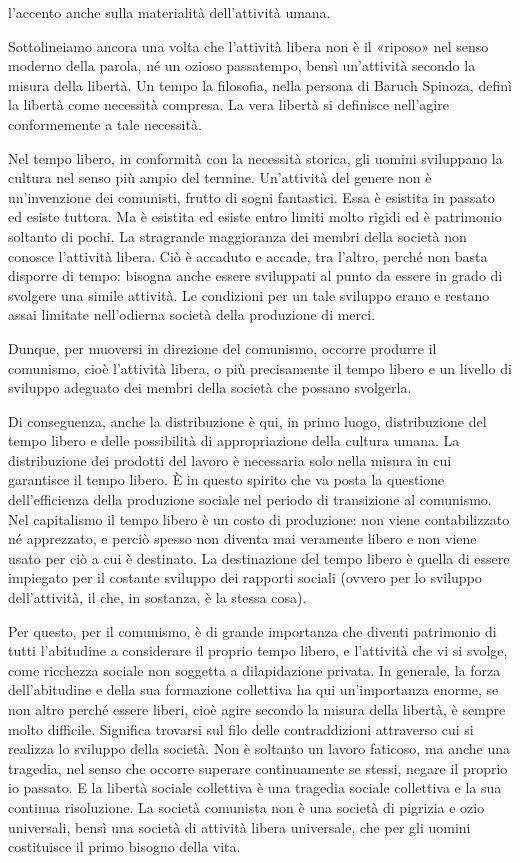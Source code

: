 \documentclass[../main]{subfiles}
\begin{document}
l'accento anche sulla materialità dell'attività umana.

Sottolineiamo ancora una volta che l'attività libera non è il «riposo» nel senso moderno della parola, né un ozioso passatempo, bensì un'attività secondo la misura della libertà. Un tempo la filosofia, nella persona di Baruch Spinoza, definì la libertà come necessità compresa. La vera libertà si definisce nell'agire conformemente a tale necessità.

Nel tempo libero, in conformità con la necessità storica, gli uomini sviluppano la cultura nel senso più ampio del termine. Un'attività del genere non è un'invenzione dei comunisti, frutto di sogni fantastici. Essa è esistita in passato ed esiste tuttora. Ma è esistita ed esiste entro limiti molto rigidi ed è patrimonio soltanto di pochi. La stragrande maggioranza dei membri della società non conosce l'attività libera. Ciò è accaduto e accade, tra l'altro, perché non basta disporre di tempo: bisogna anche essere sviluppati al punto da essere in grado di svolgere una simile attività. Le condizioni per un tale sviluppo erano e restano assai limitate nell'odierna società della produzione di merci.

Dunque, per muoversi in direzione del comunismo, occorre produrre il comunismo, cioè l'attività libera, o più precisamente il tempo libero e un livello di sviluppo adeguato dei membri della società che possano svolgerla.

Di conseguenza, anche la distribuzione è qui, in primo luogo, distribuzione del tempo libero e delle possibilità di appropriazione della cultura umana. La distribuzione dei prodotti del lavoro è necessaria solo nella misura in cui garantisce il tempo libero. È in questo spirito che va posta la questione dell'efficienza della produzione sociale nel periodo di transizione al comunismo. Nel capitalismo il tempo libero è un costo di produzione: non viene contabilizzato né apprezzato, e perciò spesso non diventa mai veramente libero e non viene usato per ciò a cui è destinato. La destinazione del tempo libero è quella di essere impiegato per il costante sviluppo dei rapporti sociali (ovvero per lo sviluppo dell'attività, il che, in sostanza, è la stessa cosa).

Per questo, per il comunismo, è di grande importanza che diventi patrimonio di tutti l'abitudine a considerare il proprio tempo libero, e l'attività che vi si svolge, come ricchezza sociale non soggetta a dilapidazione privata. In generale, la forza dell'abitudine e della sua formazione collettiva ha qui un'importanza enorme, se non altro perché essere liberi, cioè agire secondo la misura della libertà, è sempre molto difficile. Significa trovarsi sul filo delle contraddizioni attraverso cui si realizza lo sviluppo della società. Non è soltanto un lavoro faticoso, ma anche una tragedia, nel senso che occorre superare continuamente se stessi, negare il proprio io passato. E la libertà sociale collettiva è una tragedia sociale collettiva e la sua continua risoluzione. La società comunista non è una società di pigrizia e ozio universali, bensì una società di attività libera universale, che per gli uomini costituisce il primo bisogno della vita.
\end{document}
